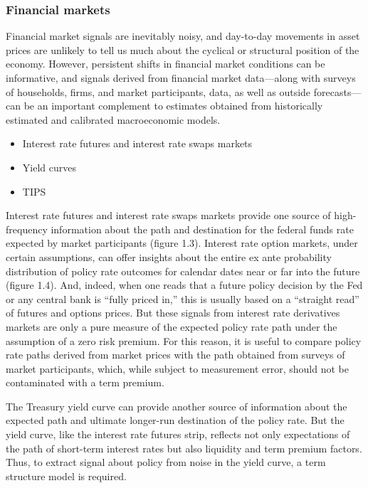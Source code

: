 \documentclass{beamer}
\begin{document}
\begin{frame}
\frametitle{Financial markets}
Financial market signals are inevitably noisy, and day-to-day movements in asset prices are unlikely to tell us much about the cyclical or structural position of the economy. However, persistent shifts in financial market conditions can be informative, and signals derived from financial market data—along with surveys of households, firms, and market participants, data, as well as outside forecasts—can be an important complement to estimates obtained from historically estimated and calibrated macroeconomic models.
\begin{itemize}
    \item Interest rate futures and interest rate swaps markets
    \item Yield curves
    \item TIPS
\end{itemize}
Interest rate futures and interest rate swaps markets provide one source of high-frequency information about the path and destination for the federal funds rate expected by market participants (figure 1.3). Interest rate option markets, under certain assumptions, can offer insights about the entire ex ante probability distribution of policy rate outcomes for calendar dates near or far into
the future (figure 1.4). And, indeed, when one reads that a future policy decision by the Fed or any central bank is “fully priced in,” this is usually based on a “straight read” of futures and options
prices. But these signals from interest rate derivatives markets are only a pure measure of the expected policy rate path under the assumption of a zero risk premium. For this reason, it is useful to compare policy rate paths derived from market prices with the path obtained from surveys of market participants, which, while subject to measurement error, should not be contaminated with a term premium.

The Treasury yield curve can provide another source of information about the expected path and ultimate longer-run destination of the policy rate. But the yield curve, like the interest rate futures strip, reflects not only expectations of the path of short-term interest rates but also liquidity and term premium factors. Thus, to extract signal about policy from noise in the yield curve, a term structure model is required.
\end{frame}
%
\end{document}
